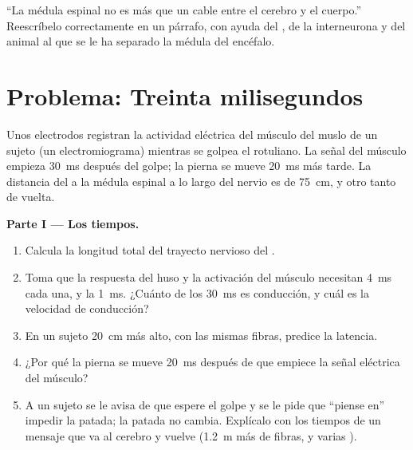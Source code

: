 \begin{exercise}[$\star\star\star$]\label{exo:g12:stretch-reflex:15}
``La médula espinal no es más que un cable entre el cerebro y el
cuerpo.'' Reescríbelo correctamente en un párrafo, con ayuda del
, de la interneurona y del animal al que se le ha separado la
médula del encéfalo.
\end{exercise}

\section{Problema: Treinta milisegundos}

\begin{problem}
\label{pb:g12:stretch-reflex:1}
Unos electrodos registran la actividad eléctrica del músculo del muslo
de un sujeto (un electromiograma) mientras se golpea el 
rotuliano. La señal del músculo empieza \qty{30}{ms} después del
golpe; la pierna se mueve \qty{20}{ms} más tarde. La distancia del
 a la médula espinal a lo largo del nervio es de \qty{75}{cm}, y
otro tanto de vuelta.

\medskip
\noindent\textbf{Parte I --- Los tiempos.}
\begin{enumerate}
  \item Calcula la longitud total del trayecto nervioso del .
  \item Toma que la respuesta del huso y la activación del músculo
        necesitan \qty{4}{ms} cada una, y la  \qty{1}{ms}.
        ¿Cuánto de los \qty{30}{ms} es conducción, y cuál es la
        velocidad de conducción?
  \item En un sujeto \qty{20}{cm} más alto, con las mismas fibras,
        predice la latencia.
  \item ¿Por qué la pierna se mueve \qty{20}{ms} después de que empiece
        la señal eléctrica del músculo?
  \item A un sujeto se le avisa de que espere el golpe y se le pide que
        ``piense en'' impedir la patada; la patada no cambia. Explícalo
        con los tiempos de un mensaje que va al cerebro y vuelve
        (\qty{1.2}{m} más de fibras, y varias ).
\end{enumerate}


\end{problem}
